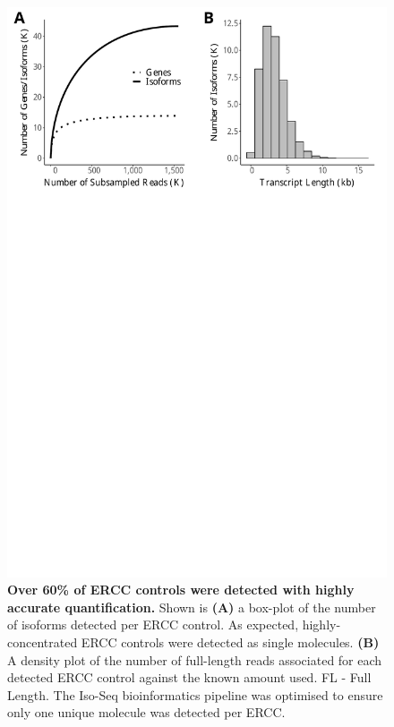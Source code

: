 \begin{figure}[htp]
	\begin{center}
		\includegraphics[page=3,trim={0 26cm 0 0},clip,scale = 0.55]{Figures/IsoSeqWholeTranscriptome.pdf}
	\end{center}
	\captionsetup{width=0.95\textwidth}
	\caption[Detection of ERCC controls from global transcriptome profiling]%
	{\textbf{Over 60\% of ERCC controls were detected with highly accurate quantification.} Shown is \textbf{(A)} a box-plot of the number of isoforms detected per ERCC control. As expected,  highly-concentrated ERCC controls were detected as single molecules. \textbf{(B)} A density plot of the number of full-length reads associated for each detected ERCC control against the known amount used. FL - Full Length. The Iso-Seq bioinformatics pipeline was optimised to ensure only one unique molecule was detected per ERCC.}
	\label{fig:isoseq_whole_ercc}
\end{figure}

